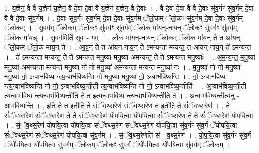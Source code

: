 \documentclass[17pt]{extarticle}
\begin{document}
1. य॒ज्ञेन॒ वै वै य॒ज्ञेन॑ य॒ज्ञेन॒ वै दे॒वा दे॒वा वै य॒ज्ञेन॑ य॒ज्ञेन॒ वै दे॒वाः । . वै दे॒वा दे॒वा वै वै दे॒वाः सु॑व॒र्गꣳ सु॑व॒र्गम् दे॒वा वै वै दे॒वाः सु॑व॒र्गम् । . दे॒वाः सु॑व॒र्गꣳ सु॑व॒र्गम् दे॒वा दे॒वाः सु॑व॒र्गम् ॅलो॒कम् ॅलो॒कꣳ सु॑व॒र्गम् दे॒वा दे॒वाः सु॑व॒र्गम् ॅलो॒कम् । . सु॒व॒र्गम् ॅलो॒कम् ॅलो॒कꣳ सु॑व॒र्गꣳ सु॑व॒र्गम् ॅलो॒क मा॑यन्-नायन् ॅलो॒कꣳ सु॑व॒र्गꣳ सु॑व॒र्गम् ॅलो॒क मा॑यन्न् । . सु॒व॒र्गमिति॑ सुवः - गम् । . लो॒क मा॑यन्-नायन् ॅलो॒कम् ॅलो॒क मा॑य॒न् ते त आ॑यन् ॅलो॒कम् ॅलो॒क मा॑य॒न् ते । . आ॒य॒न् ते त आ॑यन्-नाय॒न् ते॑ ऽमन्यन्ता मन्यन्त॒ त आ॑यन्-नाय॒न् ते॑ ऽमन्यन्त । . ते॑ ऽमन्यन्ता मन्यन्त॒ ते ते॑ ऽमन्यन्त मनु॒ष्या॑ मनु॒ष्या॑ अमन्यन्त॒ ते ते॑ ऽमन्यन्त मनु॒ष्याः᳚ । . अ॒म॒न्य॒न्त॒ म॒नु॒ष्या॑ मनु॒ष्या॑ अमन्यन्ता मन्यन्त मनु॒ष्या॑ नो नो मनु॒ष्या॑ अमन्यन्ता मन्यन्त मनु॒ष्या॑ नः । . म॒नु॒ष्या॑ नो नो मनु॒ष्या॑ मनु॒ष्या॑ नो॒ ऽन्वाभ॑विष्य न्त्य॒न्वाभ॑विष्यन्ति नो मनु॒ष्या॑ मनु॒ष्या॑ नो॒ ऽन्वाभ॑विष्यन्ति । . नो॒ ऽन्वाभ॑विष्य न्त्य॒न्वाभ॑विष्यन्ति नो नो॒ ऽन्वाभ॑विष्य॒न्तीती त्य॒न्वाभ॑विष्यन्ति नो नो॒ ऽन्वाभ॑विष्य॒न्तीति॑ । . अ॒न्वाभ॑विष्य॒न्तीती त्य॒न्वाभ॑विष्य न्त्य॒न्वाभ॑विष्य॒न्तीति॒ ते त इत्य॒न्वाभ॑विष्य न्त्य॒न्वाभ॑विष्य॒न्तीति॒ ते । . अ॒न्वाभ॑विष्य॒न्तीत्य॑नु - आभ॑विष्यन्ति । . इति॒ ते त इतीति॒ ते सं॑ॅवथ्स॒रेण॑ संॅवथ्स॒रेण॒ त इतीति॒ ते सं॑ॅवथ्स॒रेण॑ । . ते सं॑ॅवथ्स॒रेण॑ संॅवथ्स॒रेण॒ ते ते सं॑ॅवथ्स॒रेण॑ योपयि॒त्वा यो॑पयि॒त्वा सं॑ॅवथ्स॒रेण॒ ते ते सं॑ॅवथ्स॒रेण॑ योपयि॒त्वा । . सं॒ॅव॒थ्स॒रेण॑ योपयि॒त्वा यो॑पयि॒त्वा सं॑ॅवथ्स॒रेण॑ संॅवथ्स॒रेण॑ योपयि॒त्वा सु॑व॒र्गꣳ सु॑व॒र्गं ॅयो॑पयि॒त्वा सं॑ॅवथ्स॒रेण॑ संॅवथ्स॒रेण॑ योपयि॒त्वा सु॑व॒र्गम् । . सं॒ॅव॒थ्स॒रेणेति॑ सं - व॒थ्स॒रेण॑ । . यो॒प॒यि॒त्वा सु॑व॒र्गꣳ सु॑व॒र्गं ॅयो॑पयि॒त्वा यो॑पयि॒त्वा सु॑व॒र्गम् ॅलो॒कम् ॅलो॒कꣳ सु॑व॒र्गं ॅयो॑पयि॒त्वा यो॑पयि॒त्वा सु॑व॒र्गम् ॅलो॒कम् । \newline
\end{document}
